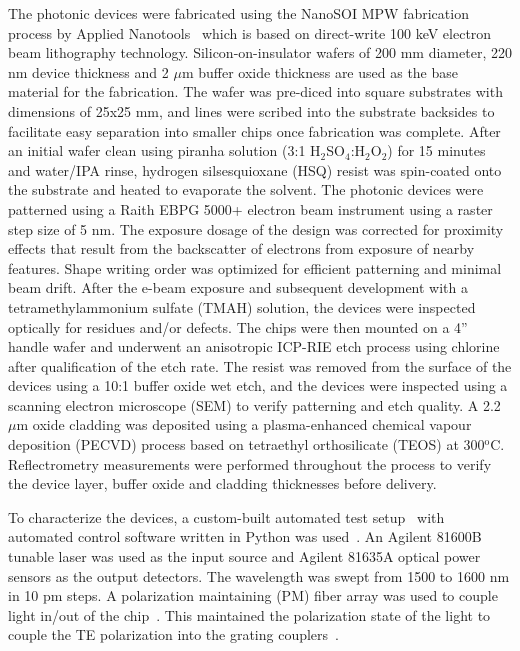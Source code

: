 \documentclass[journal]{IEEEtran}
\begin{document}
The photonic devices were fabricated using the NanoSOI MPW fabrication process by Applied Nanotools~\cite{ANT} which is based on direct-write 100 keV electron beam lithography technology. Silicon-on-insulator wafers of 200 mm diameter, 220 nm device thickness and 2 $\mu$m buffer oxide thickness are used as the base material for the fabrication. The wafer was pre-diced into square substrates with dimensions of 25x25 mm, and lines were scribed into the substrate backsides to facilitate easy separation into smaller chips once fabrication was complete. After an initial wafer clean using piranha solution (3:1 H$_2$SO$_4$:H$_2$O$_2$) for 15 minutes and water/IPA rinse, hydrogen silsesquioxane (HSQ) resist was spin-coated onto the substrate and heated to evaporate the solvent. The photonic devices were patterned using a Raith EBPG 5000+ electron beam instrument using a raster step size of 5 nm. The exposure dosage of the design was corrected for proximity effects that result from the backscatter of electrons from exposure of nearby features. Shape writing order was optimized for efficient patterning and minimal beam drift. After the e-beam exposure and subsequent development with a tetramethylammonium sulfate (TMAH) solution, the devices were inspected optically for residues and/or defects. The chips were then mounted on a 4” handle wafer and underwent an anisotropic ICP-RIE etch process using chlorine after qualification of the etch rate. The resist was removed from the surface of the devices using a 10:1 buffer oxide wet etch, and the devices were inspected using a scanning electron microscope (SEM) to verify patterning and etch quality. A 2.2 $\mu$m oxide cladding was deposited using a plasma-enhanced chemical vapour deposition (PECVD) process based on tetraethyl orthosilicate (TEOS) at 300$^{\text{o}}$C. Reflectrometry measurements were performed throughout the process to verify the device layer, buffer oxide and cladding thicknesses before delivery.

To characterize the devices, a custom-built automated test setup~\cite{Chrostowski2015, MLP} with automated control software written in Python was used~\cite{siepic}.  An Agilent 81600B tunable laser was used as the input source and Agilent 81635A optical power sensors as the output detectors. The wavelength was swept from 1500 to 1600 nm in 10 pm steps.  A polarization maintaining (PM) fiber array was used to couple light in/out of the chip~\cite{PLC}. This maintained the polarization state of the light to couple the TE polarization into the grating couplers~\cite{Wang2014}.
\end{document}
